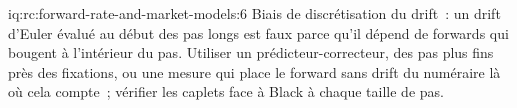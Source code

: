 \begin{solution}{iq:rc:forward-rate-and-market-models:6}
Biais de discrétisation du drift~: un drift d'Euler évalué au début des pas longs
est faux parce qu'il dépend de forwards qui bougent à l'intérieur du pas. Utiliser
un prédicteur-correcteur, des pas plus fins près des fixations, ou une mesure qui place
le forward sans drift du numéraire là où cela compte~; vérifier les caplets face à Black à
chaque taille de pas.
\end{solution}
